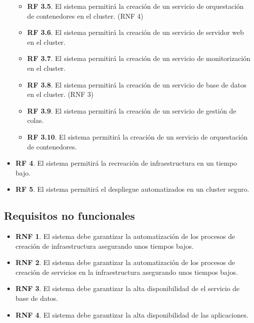\begin{itemize}
\begin{itemize}
			\item \textbf{RF 3.5}. El sistema permitirá la creación de un servicio de orquestación de contenedores en el cluster. (RNF 4)
			\item \textbf{RF 3.6}. El sistema permitirá la creación de un servicio de servidor web en el cluster.
			\item \textbf{RF 3.7}. El sistema permitirá la creación de un servicio de monitorización en el cluster.
			\item \textbf{RF 3.8}. El sistema permitirá la creación de un servicio de base de datos en el cluster. (RNF 3)
			\item \textbf{RF 3.9}. El sistema permitirá la creación de un servicio de gestión de colas.
			\item \textbf{RF 3.10}. El sistema permitirá la creación de un servicio de orquestación de contenedores.
		\end{itemize}
	
	\item \textbf{RF 4}. El sistema permitirá la recreación de infraestructura en un tiempo bajo. \label{RF4}
	
	\item \textbf{RF 5}. El sistema permitirá el despliegue automatizados en un cluster seguro. \label{RF5}
	\end{itemize}

	\subsection{Requisitos no funcionales}
	\begin{itemize}
		\item \textbf{RNF 1}. El sistema debe garantizar la automatización de los procesos de creación de infraestructura asegurando unos tiempos bajos.
		\item \textbf{RNF 2}. El sistema debe garantizar la automatización de los procesos de creación de servicios en la infraestructura asegurando unos tiempos bajos.
		\item \textbf{RNF 3}. El sistema debe garantizar la alta disponibilidad de el servicio de base de datos.
		\item \textbf{RNF 4}. El sistema debe garantizar la alta disponibilidad de las aplicaciones.
	\end{itemize}

